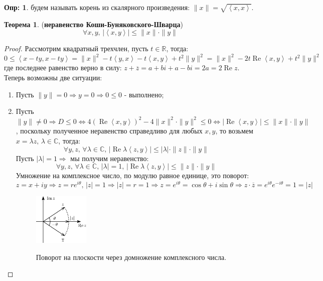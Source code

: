 \documentclass[12pt]{article}
\newcommand{\MR}{\mathbb{R}}
\newcommand{\MC}{\mathbb{C}}
\theoremstyle{definition}
\newtheorem{defn}{Опр:}
\newtheorem{theorem}{Теорема}
\newcommand{\inner}[2]{\left\langle #1, #2 \right\rangle }
\begin{document}
\begin{defn}
	 будем называть корень из скалярного произведения: $\|x\| = \sqrt{\inner{x}{x}}$.
\end{defn}

\begin{theorem}(\textbf{неравенство Коши-Буняковского-Шварца})
	$$
		\forall x,y, \, |\inner{x}{y}| \leq \|x\|{\cdot}\|y\|
	$$
\end{theorem}
\begin{proof}
	Рассмотрим квадратный трехчлен, пусть $t \in \MR$, тогда:
	$$
		0\leq \inner{x -ty}{x-ty} = \|x\|^2 - t\inner{y}{x} - t\inner{x}{y} + t^2\|y\|^2 = \|x\|^2 - 2t\operatorname{Re}\inner{x}{y} + t^2\|y\|^2
	$$
	где последнее равенство верно в силу: $z + \overline{z} = a + bi + a - bi = 2a = 2\operatorname{Re}z$. Теперь возможны две ситуации:
	\begin{enumerate}[label=(\arabic*)]
		\item Пусть $\|y\| =0 \Rightarrow y = 0 \Rightarrow 0 \leq 0$ - выполнено;
		\item Пусть $\|y\| \neq 0 \Rightarrow D \leq 0 \Leftrightarrow 4(\operatorname{Re}\inner{x}{y})^2 - 4\|x\|^2{\cdot}\|y\|^2 \leq 0 \Leftrightarrow |\operatorname{Re}\inner{x}{y}| \leq \|x\|{\cdot}\|y\|$, поскольку полученное неравенство справедливо для любых $x,y$, то возьмем $x = \lambda z, \, \lambda \in \MC$, тогда:
		$$
			\forall y,z, \, \forall \lambda \in \MC,\, |\operatorname{Re}\lambda\inner{z}{y}| \leq |\lambda|{\cdot}\|z\|{\cdot}\|y\|
		$$
		Пусть $|\lambda| = 1 \Rightarrow$ мы получим неравенство: 
		$$
			\forall y,z, \, \forall \lambda \in \MC,\,|\lambda|=1 ,\, |\operatorname{Re}\lambda\inner{z}{y}| \leq \|z\|{\cdot}\|y\|
		$$ 
		Умножение на комплексное число, по модулю равное единице, это поворот:
		$$
			z = x + iy \Rightarrow z = re^{i\theta}, \, |z| = 1 \Rightarrow  |z| = r = 1 \Rightarrow z = e^{i\theta} = \cos{\theta} + i\sin{\theta} \Rightarrow z{\cdot}\overline{z} = e^{i\theta}e^{-i\theta} = 1 = |z|
		$$
		\begin{figure}[H]
			\centering
			\includegraphics[width=0.25\textwidth]{MA3L27_1.eps}
			\label{MA3L27_1}
			\caption{Поворот на плоскости через домножение комплексного числа.}

\end{figure}
\end{enumerate}
\end{proof}
\end{document}
